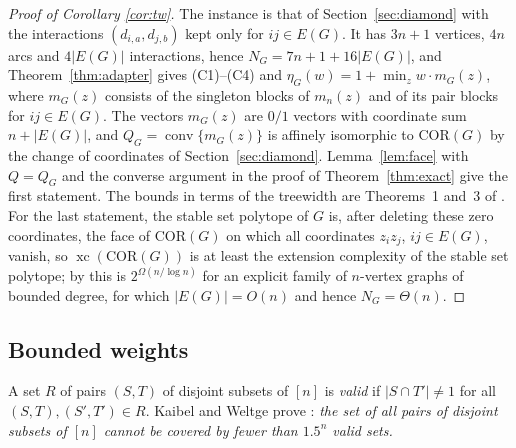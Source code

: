 \documentclass[11pt]{amsart}
\theoremstyle{plain}
\theoremstyle{definition}
\theoremstyle{remark}
\newcommand{\COR}{\mathrm{COR}}
\newcommand{\xc}{\operatorname{xc}}
\begin{document}
\begin{proof}[Proof of Corollary \ref{cor:tw}]
The instance is that of Section~\ref{sec:diamond} with the interactions $(d_{i,a},d_{j,b})$ kept only for
$ij\in E(G)$. It has $3n+1$ vertices, $4n$ arcs and $4|E(G)|$ interactions, hence $N_G=7n+1+16|E(G)|$, and
Theorem~\ref{thm:adapter} gives \textup{(C1)--(C4)} and $\eta_G(w)=1+\min_zw\cdot m_G(z)$, where $m_G(z)$ consists
of the singleton blocks of $m_n(z)$ and of its pair blocks for $ij\in E(G)$. The vectors $m_G(z)$ are $0/1$ vectors
with coordinate sum $n+|E(G)|$, and $Q_G=\operatorname{conv}\{m_G(z)\}$ is affinely isomorphic to $\COR(G)$ by the
change of coordinates of Section~\ref{sec:diamond}. Lemma~\ref{lem:face} with $Q=Q_G$ and the converse argument in
the proof of Theorem~\ref{thm:exact} give the first statement. The bounds in terms of the treewidth are Theorems~1
and~3 of \cite{AFHMS}. For the last statement, the stable set polytope of $G$ is, after deleting these zero coordinates, the face of
$\COR(G)$ on which all coordinates $z_iz_j$, $ij\in E(G)$, vanish, so $\xc(\COR(G))$ is at least the extension complexity of the stable set
polytope; by \cite[Theorem~1]{GJW} this is $2^{\Omega(n/\log n)}$ for an explicit family of $n$-vertex graphs of
bounded degree, for which $|E(G)|=O(n)$ and hence $N_G=\Theta(n)$.
\end{proof}

\subsection*{Bounded weights}
A set $R$ of pairs $(S,T)$ of disjoint subsets of $[n]$ is \emph{valid} if $|S\cap T'|\ne1$ for all
$(S,T),(S',T')\in R$. Kaibel and Weltge prove \cite[proof of Theorem~1]{KW}: \emph{the set of all pairs of disjoint
subsets of $[n]$ cannot be covered by fewer than $1.5^n$ valid sets.}
\end{document}
